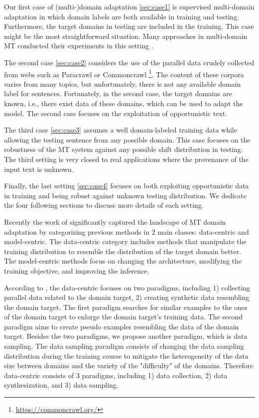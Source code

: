 Our first case of (multi-)domain adaptation \ref{sec:case1} is supervised multi-domain adaptation in which domain labels are both available in training and testing. Furthermore, the target domains in testing are included in the training. This case might be the most straightforward situation. Many approaches in multi-domain MT conducted their experiments in this setting \citep{Pham21revisiting}. 

The second case \ref{sec:case2} considers the use of the parallel data crudely collected from webs such as Paracrawl \citep{Banon20Paracrawl} or Commoncrawl \footnote{\url{https://commoncrawl.org/}}. The content of these corpora varies from many topics, but unfortunately, there is not any available domain label for sentences. Fortunately, in the second case, the target domains are known, i.e., there exist data of these domains, which can be used to adapt the model. The second case focuses on the exploitation of opportunistic text. 

The third case \ref{sec:case3} assumes a well domain-labeled training data while allowing the testing sentence from any possible domain. This case focuses on the robustness of the MT system against any possible shift distribution in testing. The third setting is very closed to real applications where the provenance of the input text is unknown. 

Finally, the last setting \ref{sec:case4} focuses on both exploiting opportunistic data in training and being robust against unknown testing distribution. We dedicate the four following sections to discuss more details of each setting.

Recently the work of \citet{Chu18survey} significantly captured the landscape of MT domain adaptation by categorizing previous methods in 2 main classes: data-centric and model-centric. The data-centric category includes methods that manipulate the training distribution to resemble the distribution of the target domain better. The model-centric methods focus on changing the architecture, modifying the training objective, and improving the inference.

According to \citet{Chu18asurvey}, the data-centric focuses on two paradigms, including 1) collecting parallel data related to the domain target, 2) creating synthetic data resembling the domain target. The first paradigm searches for similar examples to the ones of the domain target to enlarge the domain target's training data. The second paradigm aims to create pseudo examples resembling the data of the domain target. Besides the two paradigms, we propose another paradigm, which is data sampling. The data sampling paradigm consists of changing the data sampling distribution during the training course to mitigate the heterogeneity of the data size between domains and the variety of the "difficulty" of the domains. Therefore data-centric consists of 3 paradigms, including 1) data collection, 2) data synthesization, and 3) data sampling.

